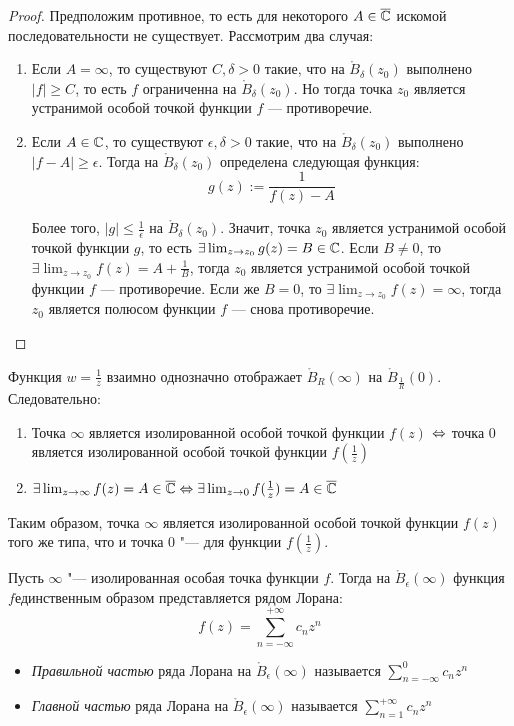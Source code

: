 \begin{proof}
	Предположим противное, то есть для некоторого $A \in \overline{\mathbb{C}}$ искомой последовательности не существует. Рассмотрим два случая:
	\begin{enumerate}
		\item Если $A = \infty$, то существуют $C, \delta > 0$ такие, что на $\mathring B_\delta(z_0)$ выполнено $|f| \ge C$, то есть $f$ ограниченна на $\mathring B_\delta(z_0)$. Но тогда точка $z_0$ является устранимой особой точкой функции $f$ --- противоречие.
		
		\item Если $A \in \mathbb{C}$, то существуют $\epsilon, \delta > 0$ такие, что на $\mathring B_\delta(z_0)$ выполнено $|f - A| \ge \epsilon$. Тогда на $\mathring B_\delta(z_0)$ определена следующая функция:
		\[g(z) := \frac{1}{f(z) - A}\]
		
		Более того, $|g| \le \frac1\epsilon$ на $\mathring B_\delta(z_0)$. Значит, точка $z_0$ является устранимой особой точкой функции $g$, то есть $\exists \lim_{z \to z_0} g(z) = B \in \mathbb{C}$. Если $B \ne 0$, то $\exists \lim_{z \to z_0} f(z) = A + \frac1B$, тогда $z_0$ является устранимой особой точкой функции $f$ --- противоречие. Если же $B = 0$, то $\exists \lim_{z \to z_0} f(z) = \infty$, тогда $z_0$ является полюсом функции $f$ --- снова противоречие.\qedhere
	\end{enumerate}
\end{proof}

\begin{note}
	Функция $w = \frac1z$ взаимно однозначно отображает $\mathring B_R(\infty)$ на $\mathring B_{\frac1R}(0)$. Следовательно:
	\begin{enumerate}
		\item Точка $\infty$ является изолированной особой точкой функции $f(z)$ $\Leftrightarrow$ точка $0$ является изолированной особой точкой функции $f(\frac1z)$
		\item $\exists \lim_{z \to \infty}f(z) = A \in \overline{\mathbb{C}} \Leftrightarrow \exists \lim_{z \to 0}f(\frac1z) = A \in \overline{\mathbb{C}}$
	\end{enumerate}
	
	Таким образом, точка $\infty$ является изолированной особой точкой функции $f(z)$ того же типа, что и точка $0$ "--- для функции $f(\frac1z)$.
\end{note}

\begin{definition}
	Пусть $\infty$ "--- изолированная особая точка функции $f$. Тогда на $\mathring B_\epsilon(\infty)$ функция $f$единственным образом представляется рядом Лорана:
	\[f(z) = \sum_{n = -\infty}^{+\infty}c_nz^n\]
	\begin{itemize}
		\item \textit{Правильной частью} ряда Лорана на $\mathring B_\epsilon(\infty)$ называется $\sum_{n = -\infty}^{0}c_nz^n$
		\item \textit{Главной частью} ряда Лорана на $\mathring B_\epsilon(\infty)$ называется $\sum_{n = 1}^{+\infty}c_nz^n$
	\end{itemize}
\end{definition}

